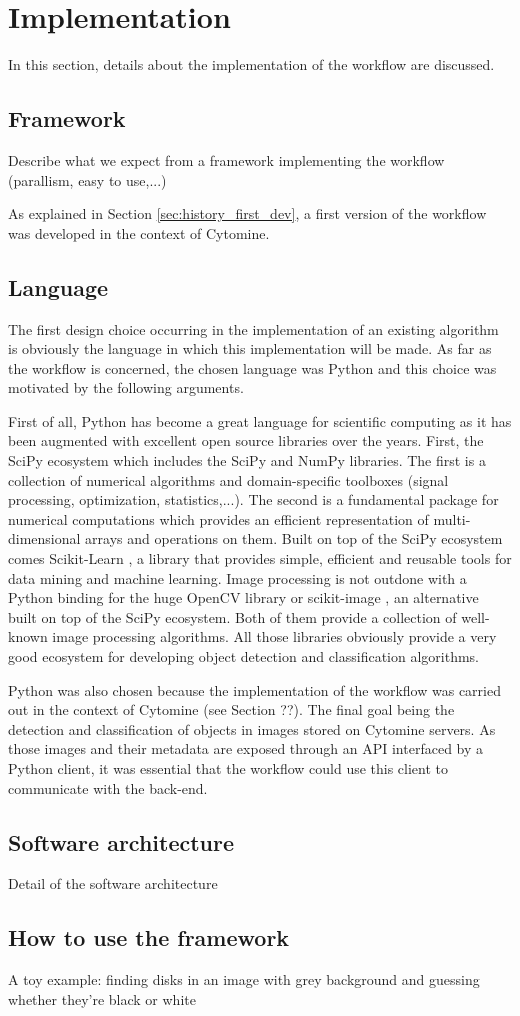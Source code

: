 \section{Implementation}
\label{sec:workflow_impl}
In this section, details about the implementation of the workflow are discussed.  
\subsection{Framework}
Describe what we expect from a framework implementing the workflow (parallism, easy to use,...) 

As explained in Section \ref{sec:history_first_dev}, a first version of the workflow was developed in the context of Cytomine. 
\subsection{Language}
The first design choice occurring in the implementation of an existing algorithm is obviously the language in which this implementation will be made. As far as the workflow is concerned, the chosen language was Python and this choice was motivated by the following arguments. 

First of all, Python has become a great language for scientific computing as it has been augmented with excellent open source libraries over the years. First, the SciPy ecosystem which includes the SciPy \cite{oliphant:2007} and NumPy \cite{vanderwalt:2011} libraries. The first is a collection of numerical algorithms and domain-specific toolboxes (signal processing, optimization, statistics,...). The second is a fundamental package for numerical computations which provides an efficient representation of multi-dimensional arrays and operations on them. Built on top of the SciPy ecosystem comes Scikit-Learn \cite{pedregosa:2011}, a library that provides simple, efficient and reusable tools for data mining and machine learning. Image processing is not outdone with a Python binding for the huge OpenCV library \cite{opencv_library} or scikit-image \cite{scikit-image}, an alternative built on top of the SciPy ecosystem. Both of them provide a collection of well-known image processing algorithms. All those libraries obviously provide a very good ecosystem for developing object detection and classification algorithms.

Python was also chosen because the implementation of the workflow was carried out in the context of Cytomine (see Section ??). The final goal being the detection and classification of objects in images stored on Cytomine servers. As those images and their metadata are exposed through an API interfaced by a Python client, it was essential that the workflow could use this client to communicate with the back-end. 

 
\subsection{Software architecture}
Detail of the software architecture
\subsection{How to use the framework}
A toy example: finding disks in an image with grey background and guessing whether they're black or white 